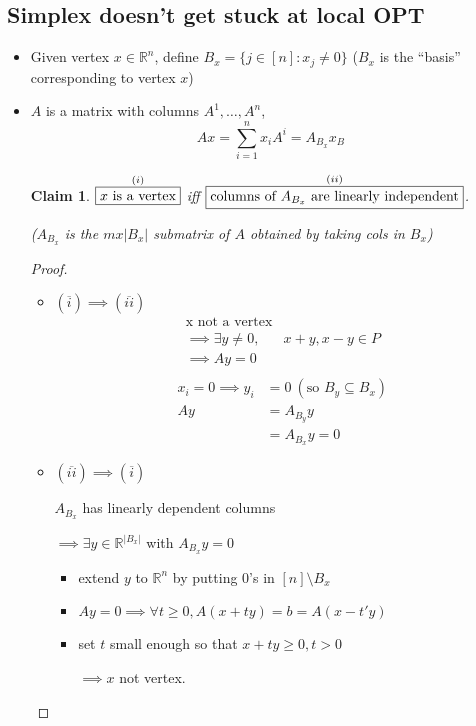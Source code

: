 \documentclass[11pt]{article}
\newcommand{\R}{\mathbb{R}}
\newtheorem{claim}[theorem]{Claim}
\begin{document}
\subsection{Simplex doesn't get stuck at local \textsf{OPT}}
\begin{itemize}
\item Given vertex $x \in \R^n$, define $B_x = \{j \in [n] : x_j \neq 0\}$
  ($B_x$ is the ``basis'' corresponding to vertex $x$)
\item $A$ is a matrix with columns $A^1,\ldots,A^n$,
  \[Ax = \sum_{i=1}^n x_iA^i = A_{B_x} x_B\]
  \begin{claim}
    $\stackrel{(i)}{\fbox{$x$ is a vertex}}$ iff $\stackrel{(ii)}{\fbox{columns of $A_{B_x}$ are linearly independent}}$.

    ($A_{B_x}$ is the $mx |B_x|$ submatrix of $A$ obtained by taking cols in $B_x$)
  \end{claim}
  \begin{proof}
    \begin{itemize}
      
    \item
      $(\overline{i}) \implies (\overline{ii})$
      \begin{align*}
        \text{x not a vertex}\\
        \implies \exists y \neq 0,~& x+y, x-y \in P \\
        \implies Ay = 0 \\
      \end{align*}
      \begin{align*}
        x_i = 0 \implies y_i &= 0 ~ (\text{so } B_y \subseteq B_x ) \\
        Ay &= A_{B_y} y \\
           &=A_{B_x} y = 0
      \end{align*}
      \begin{flushright} \checkmark \end{flushright}

    \item
      $(\overline{ii}) \implies (\overline{i})$

      $A_{B_x}$ has linearly dependent columns

      $\implies \exists y \in \R^{|B_x|}$ with $A_{B_x} y = 0$
      \begin{itemize}
      \item extend $y$ to $\R^n$ by putting $0$'s in $[n]\setminus B_x$
      \item $Ay = 0 \implies \forall t \geq 0, A(x + ty) = b = A(x - t'y)$
      \item set $t$ small enough so that $x+ty \geq 0, t > 0$

        $\implies x$ not vertex.
      \end{itemize}
    \end{itemize}
    \begin{flushright} \checkmark \end{flushright}
  \end{proof}

\end{itemize}
\end{document}
